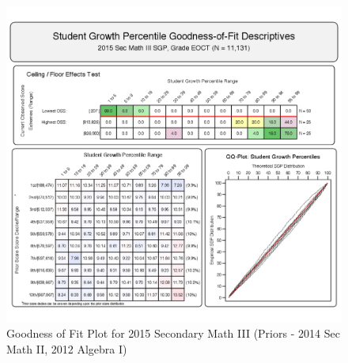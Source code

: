 \documentclass[12pt]{article}
\begin{document}
\begin{figure}[htbp]
\centering
\includegraphics{../img/Goodness_of_Fit/SEC_MATH_III.2015/2015_SEC_MATH_III_EOCT;2014_SEC_MATH_II_EOCT;2012_ALGEBRA_I_EOCT.png}
\caption{Goodness of Fit Plot for 2015 Secondary Math III (Priors - 2014
Sec Math II, 2012 Algebra I)}
\end{figure}



\end{document}
